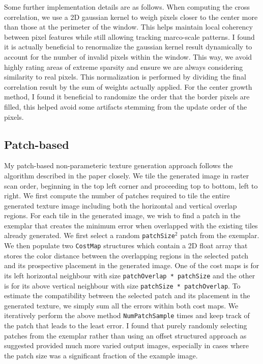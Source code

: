\documentclass[a4paper, 11pt, titlepage]{article}
\begin{document}
Some further implementation details are as follows. When computing the cross
correlation, we use a 2D gaussian kernel to weigh pixels closer to the center
more than those at the perimeter of the window. This helps maintain local
coherency between pixel features while still allowing tracking marco-scale patterns.
I found it is actually beneficial to renormalize the gaussian kernel result
dynamically to account for the number of invalid pixels within the window. This
way, we avoid highly rating areas of extreme sparsity and ensure we are always
considering similarity to real pixels. This normalization is performed by
dividing the final correlation result by the sum of weights actually applied.
For the center growth method, I found it beneficial to randomize the order that
the border pixels are filled, this helped avoid some artifacts stemming from
the update order of the pixels.

\subsection{Patch-based}
My patch-based non-parameteric texture generation approach follows the algorithm
described in the paper closely. We tile the generated image in raster scan
order, beginning in the top left corner and proceeding top to bottom, left to
right. We first compute the number of patches required to tile the entire
generated texture image including both the horizontal and vertical overlap
regions.
For each tile in the generated image, we wish to find a patch in the exemplar
that creates the minimum error when overlapped with the existing tiles already
generated. We first select a random \texttt{patchSize}$^2$ patch from the
exemplar. We then populate two \texttt{CostMap} structures which contain a 2D
float array that stores the color distance between the overlapping regions in
the selected patch and its prospective placement in the generated image. One of
the cost maps is for its left horizontal neighbour with size \texttt{patchOverlap
* patchSize} and the other is for its above vertical neighbour with size
\texttt{patchSize * patchOverlap}. To estimate the compatibility between the
selected patch and its placement in the generated texture, we simply sum all the
errors within both cost maps. We iteratively perform the above method
\texttt{NumPatchSample} times and keep track of the patch that leads to the
least error. I found that purely randomly selecting patches from the exemplar
rather than using an offset structured approach as suggested provided much more
varied output images, especially in cases where the patch size was a significant
fraction of the example image.
\end{document}
